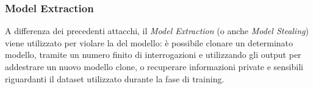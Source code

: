 \subsubsection{Model Extraction}
A differenza dei precedenti attacchi, il \textit{Model Extraction} (o anche \textit{Model Stealing}) viene utilizzato per violare la  del modello: è possibile clonare un determinato modello, tramite un numero finito di interrogazioni e utilizzando gli output per addestrare un nuovo modello clone, o recuperare informazioni private e sensibili riguardanti il  dataset utilizzato durante la fase di training.
